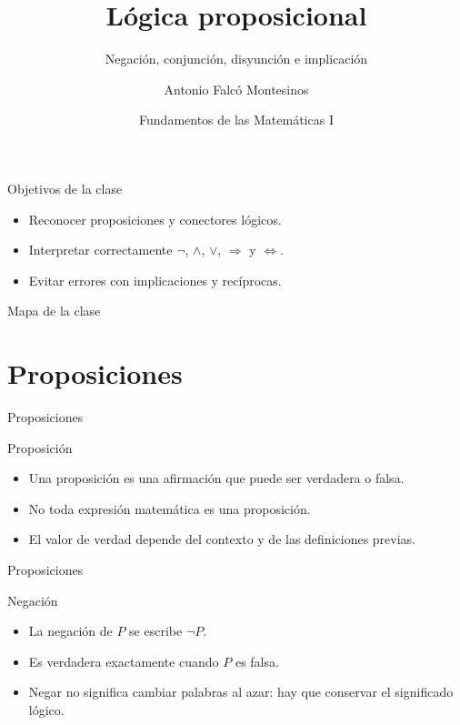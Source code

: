 \documentclass[aspectratio=169,11pt]{beamer}
\title[FdM I -- Clase 03]{Lógica proposicional}
\subtitle{Negación, conjunción, disyunción e implicación}
\author{Antonio Falcó Montesinos}
\institute{Universidad CEU Cardenal Herrera}
\date{Fundamentos de las Matemáticas I}
\begin{document}
\begin{frame}
  \titlepage
\end{frame}

\begin{frame}{Objetivos de la clase}
\begin{itemize}
  \item Reconocer proposiciones y conectores lógicos.
  \item Interpretar correctamente \(\neg\), \(\wedge\), \(\vee\), \(\Rightarrow\) y \(\Leftrightarrow\).
  \item Evitar errores con implicaciones y recíprocas.
\end{itemize}
\end{frame}

\begin{frame}{Mapa de la clase}
\tableofcontents
\end{frame}

\section{Proposiciones}

\begin{frame}{Proposiciones}
\begin{block}{Proposición}
\begin{itemize}
  \item Una proposición es una afirmación que puede ser verdadera o falsa.
  \item No toda expresión matemática es una proposición.
  \item El valor de verdad depende del contexto y de las definiciones previas.
\end{itemize}
\end{block}
\end{frame}

\begin{frame}{Proposiciones}
\begin{block}{Negación}
\begin{itemize}
  \item La negación de \(P\) se escribe \(\neg P\).
  \item Es verdadera exactamente cuando \(P\) es falsa.
  \item Negar no significa cambiar palabras al azar: hay que conservar el significado lógico.
\end{itemize}
\end{block}
\end{frame}
\end{document}
